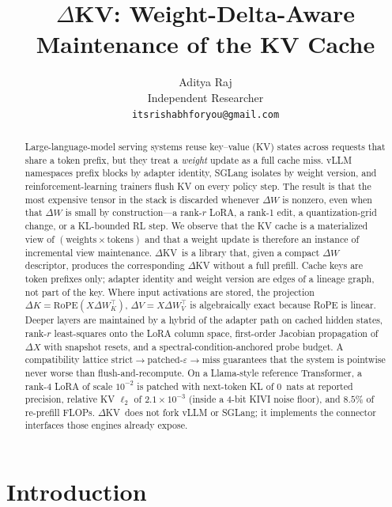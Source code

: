 \documentclass{article}
\title{$\Delta$KV: Weight-Delta-Aware Maintenance of the KV Cache}
\author{
  Aditya Raj \\
  Independent Researcher \\
  \texttt{itsrishabhforyou@gmail.com}
}
\date{}
\newcommand{\dkv}{$\Delta$KV}
\begin{document}
\maketitle

\begin{abstract}
Large-language-model serving systems reuse key--value (KV) states across
requests that share a token prefix, but they treat a \emph{weight} update
as a full cache miss.
vLLM namespaces prefix blocks by adapter identity, SGLang isolates by
weight version, and reinforcement-learning trainers flush KV on every
policy step.
The result is that the most expensive tensor in the stack is discarded
whenever $\Delta W$ is nonzero, even when that $\Delta W$ is small by
construction---a rank-$r$ LoRA, a rank-1 edit, a quantization-grid change,
or a KL-bounded RL step.
We observe that the KV cache is a materialized view of
$(\mathrm{weights}\times\mathrm{tokens})$ and that a weight update is
therefore an instance of incremental view maintenance.
\dkv\ is a library that, given a compact $\Delta W$ descriptor, produces
the corresponding $\Delta$KV without a full prefill.
Cache keys are token prefixes only; adapter identity and weight version
are edges of a lineage graph, not part of the key.
Where input activations are stored, the projection
$\Delta K=\mathrm{RoPE}(X\Delta W_K^\top)$, $\Delta V=X\Delta W_V^\top$
is algebraically exact because RoPE is linear.
Deeper layers are maintained by a hybrid of the adapter path on cached
hidden states, rank-$r$ least-squares onto the LoRA column space,
first-order Jacobian propagation of $\Delta X$ with snapshot resets, and
a spectral-condition-anchored probe budget.
A compatibility lattice $\mathrm{strict}\to\mathrm{patched}\text{-}\varepsilon\to\mathrm{miss}$
guarantees that the system is pointwise never worse than
flush-and-recompute.
On a Llama-style reference Transformer, a rank-4 LoRA of scale $10^{-2}$
is patched with next-token KL of $0$~nats at reported precision, relative
KV $\ell_2$ of $2.1\times 10^{-3}$ (inside a 4-bit KIVI noise floor), and
$8.5\%$ of re-prefill FLOPs.
\dkv\ does not fork vLLM or SGLang; it implements the connector
interfaces those engines already expose.
\end{abstract}


\section{Introduction}
\label{sec:intro}
\end{document}
